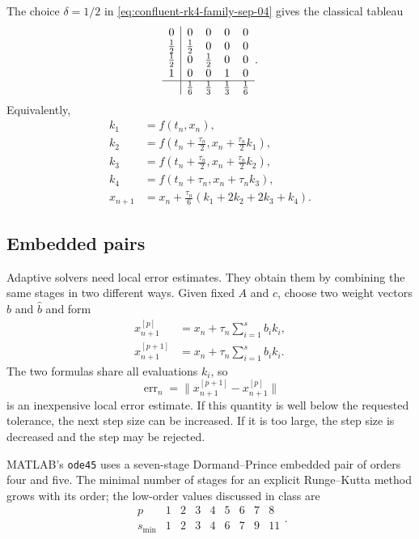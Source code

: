 \begin{example}[Classical RK4]
  The choice \(\delta=1/2\) in
  \eqref{eq:confluent-rk4-family-sep-04} gives the classical tableau
  \[
    \begin{array}{c|cccc}
      0&0&0&0&0\\
      \tfrac12&\tfrac12&0&0&0\\
      \tfrac12&0&\tfrac12&0&0\\
      1&0&0&1&0\\ \hline
       &\tfrac16&\tfrac13&\tfrac13&\tfrac16
    \end{array}.
  \]
  Equivalently,
  \begin{align*}
    k_1&=f(t_n,x_n),\\
    k_2&=f\left(t_n+\frac{\tau_n}{2},
      x_n+\frac{\tau_n}{2}k_1\right),\\
    k_3&=f\left(t_n+\frac{\tau_n}{2},
      x_n+\frac{\tau_n}{2}k_2\right),\\
    k_4&=f(t_n+\tau_n,x_n+\tau_n k_3),\\
    x_{n+1}&=x_n+\frac{\tau_n}{6}
      (k_1+2k_2+2k_3+k_4).
  \end{align*}
\end{example}

\subsection{Embedded pairs}

Adaptive solvers need local error estimates. They obtain them by
combining the same stages in two different ways. Given fixed \(A\) and \(c\), choose two
weight vectors \(b\) and \(\widehat b\) and form
\begin{align*}
  x_{n+1}^{[p]}
  &=x_n+\tau_n\sum_{i=1}^s b_i k_i,\\
  x_{n+1}^{[p+1]}
  &=x_n+\tau_n\sum_{i=1}^s \widehat b_i k_i.
\end{align*}
The two formulas share all evaluations \(k_i\), so
\[
  \operatorname{err}_n
  =\bigl\lVert x_{n+1}^{[p+1]}-x_{n+1}^{[p]}\bigr\rVert
\]
is an inexpensive local error estimate. If this quantity is well below
the requested tolerance, the next step size can be increased. If it is
too large, the step size is decreased and the step may be rejected.

MATLAB's \texttt{ode45} uses a seven-stage Dormand--Prince embedded
pair of orders four and five. The minimal number of stages for an
explicit Runge--Kutta method grows with its order; the low-order values
discussed in class are
\[
  \begin{array}{c|cccccccc}
    p&1&2&3&4&5&6&7&8\\ \hline
    s_{\min}&1&2&3&4&6&7&9&11
  \end{array}.
\]

